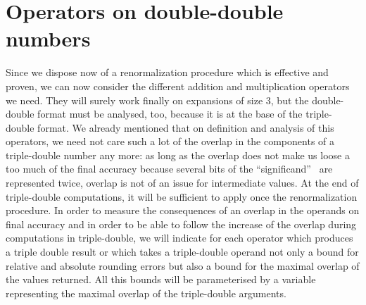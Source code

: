 \documentclass[a4paper,10pt,twoside]{article}
\newcommand{\ouvguill}{``}
\newcommand{\fermguill}{''}
\begin{document}
\section{Operators on double-double numbers}
Since we dispose now of a renormalization procedure which is effective and
proven, we can now consider the different addition and multiplication
operators we need. They will surely work finally on expansions of size $3$,
but the double-double format \cite{Dek71} must be analysed, too, because it is at the base
of the triple-double format. We already mentioned that on definition and
analysis of this operators, we need not care such a lot of the overlap in the
components of a triple-double number any more: as long as the overlap does
not make us loose a too much of the final accuracy because several bits of the
\ouvguill significand\fermguill~ are represented twice, overlap is not of an
issue for intermediate values. At the end of triple-double computations, it
will be sufficient to apply once the renormalization procedure. In order to
measure the consequences of an overlap in the operands on final accuracy and
in order to be able to follow the increase of the overlap during computations
in triple-double, we will indicate for each operator which produces a triple
double result or which takes a triple-double operand not only a bound for
relative and absolute rounding errors but also a bound for the maximal overlap
of the values returned. All this bounds will be parameterised by a variable
representing the maximal overlap of the triple-double arguments. 
\end{document}
